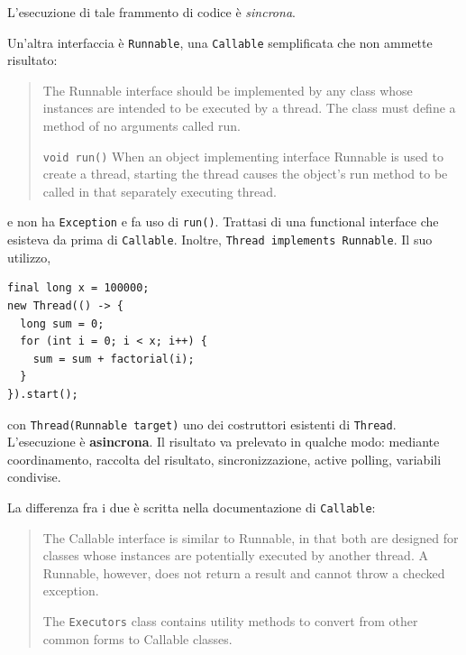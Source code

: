 \documentclass[\fontsizeclass,twocolumn]{\classname}
\theoremstyle{definition}
\theoremstyle{definition}
\begin{document}
L'esecuzione di tale frammento di codice è \emph{sincrona}.

Un'altra interfaccia è \texttt{Runnable}, una \texttt{Callable} semplificata
che non ammette risultato:
\begin{quote}
    \footnotesize{The Runnable interface should be implemented by any class whose instances are intended to be executed by a thread. The class must define a method of no arguments called run.

    \texttt{void 	run()} 	When an object implementing interface Runnable is used to create a thread, starting the thread causes the object's run method to be called in that separately executing thread.}
\end{quote}

e non ha \texttt{Exception} e fa uso di \texttt{run()}. Trattasi di una
functional interface che esisteva da prima di \texttt{Callable}. Inoltre,
\texttt{Thread implements Runnable}. Il suo utilizzo,

\begin{lstlisting}
final long x = 100000;
new Thread(() -> {
  long sum = 0;
  for (int i = 0; i < x; i++) {
    sum = sum + factorial(i);
  }
}).start();
\end{lstlisting}

con \texttt{Thread(Runnable target)} uno dei costruttori esistenti di
\texttt{Thread}. L'esecuzione è \textbf{asincrona}. Il risultato va prelevato
in qualche modo: mediante coordinamento, raccolta del risultato,
sincronizzazione, active polling, variabili condivise.

La differenza fra i due è scritta nella documentazione di \texttt{Callable}:
\begin{quote}
    \footnotesize{The Callable interface is similar to Runnable, in that both are designed for classes whose instances are potentially executed by another thread. A Runnable, however, does not return a result and cannot throw a checked exception.

        The \texttt{Executors} class contains utility methods to convert from other common forms to Callable classes.
}
\end{quote}
\end{document}
